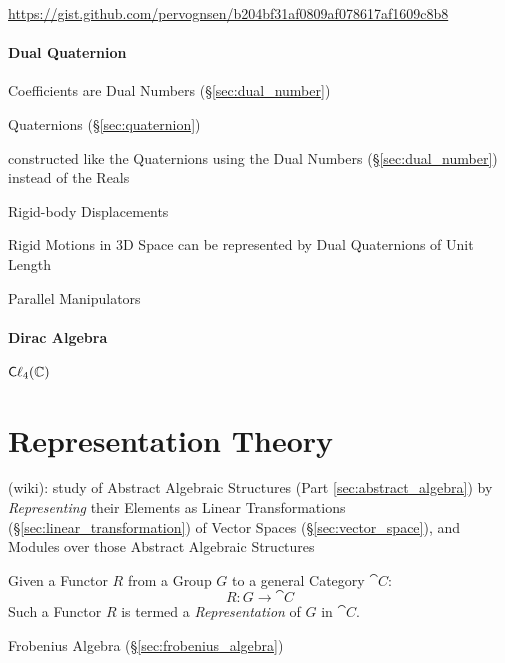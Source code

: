 \url{https://gist.github.com/pervognsen/b204bf31af0809af078617af1609c8b8}



\paragraph{Dual Quaternion}\label{sec:dual_quaternion}\hfill


Coefficients are Dual Numbers (\S\ref{sec:dual_number})

\fist Quaternions (\S\ref{sec:quaternion})

constructed like the Quaternions using the Dual Numbers
(\S\ref{sec:dual_number}) instead of the Reals

Rigid-body Displacements

Rigid Motions in 3D Space can be represented by Dual Quaternions of Unit Length

Parallel Manipulators



\paragraph{Dirac Algebra}\label{sec:dirac_algebra}\hfill

$\mathsf{C}\ell_4(\mathbb{C})$



\section{Representation Theory}\label{sec:representation_theory}

(wiki): study of Abstract Algebraic Structures (Part \ref{sec:abstract_algebra})
by \emph{Representing} their Elements as Linear Transformations
(\S\ref{sec:linear_transformation}) of Vector Spaces (\S\ref{sec:vector_space}),
and Modules over those Abstract Algebraic Structures


Given a Functor $R$ from a Group $G$ to a general Category $\cat{C}$:
\[
    R : G \rightarrow \cat{C}
\]
Such a Functor $R$ is termed a \emph{Representation} of $G$ in $\cat{C}$.

Frobenius Algebra (\S\ref{sec:frobenius_algebra})

